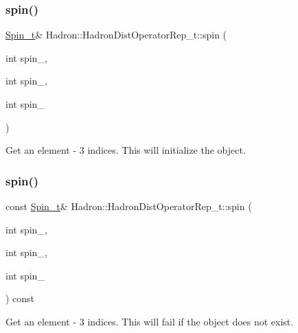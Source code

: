 \subsubsection{\texorpdfstring{spin()}{spin()}\hspace{0.1cm}{\footnotesize\ttfamily [6/16]}}
{\footnotesize\ttfamily \mbox{\hyperlink{structHadron_1_1HadronDistOperatorRep__t_1_1Spin__t}{Spin\+\_\+t}}\& Hadron\+::\+Hadron\+Dist\+Operator\+Rep\+\_\+t\+::spin (\begin{DoxyParamCaption}\item[{int}]{spin\+\_,  }\item[{int}]{spin\+\_,  }\item[{int}]{spin\+\_ }\end{DoxyParamCaption})}



Get an element -\/ 3 indices. This will initialize the object. 

\mbox{\label{classHadron_1_1HadronDistOperatorRep__t_a7d3cfc81ccf8666a8e8bb0b5cb7e919e}} 
\subsubsection{\texorpdfstring{spin()}{spin()}\hspace{0.1cm}{\footnotesize\ttfamily [7/16]}}
{\footnotesize\ttfamily const \mbox{\hyperlink{structHadron_1_1HadronDistOperatorRep__t_1_1Spin__t}{Spin\+\_\+t}}\& Hadron\+::\+Hadron\+Dist\+Operator\+Rep\+\_\+t\+::spin (\begin{DoxyParamCaption}\item[{int}]{spin\+\_,  }\item[{int}]{spin\+\_,  }\item[{int}]{spin\+\_ }\end{DoxyParamCaption}) const}



Get an element -\/ 3 indices. This will fail if the object does not exist. 

\mbox{\label{classHadron_1_1HadronDistOperatorRep__t_a436620dfee9ff1c98febcc5ae7b0ff3a}} 
